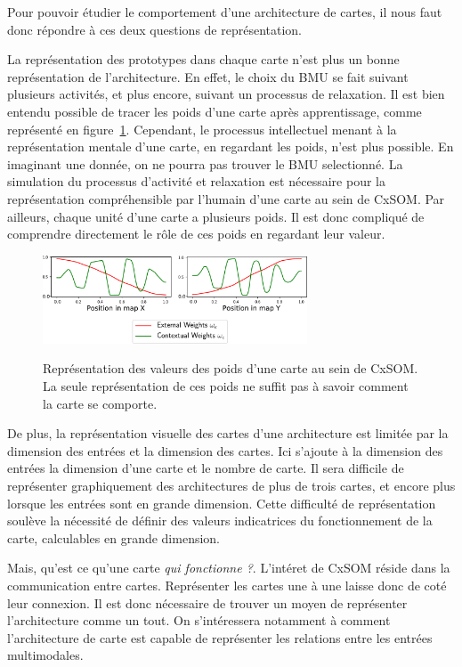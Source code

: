 Pour pouvoir étudier le comportement d'une architecture de cartes, il nous faut donc répondre à ces deux questions de représentation. 

La représentation des prototypes dans chaque carte n'est plus un bonne représentation de l'architecture.
En effet, le choix du BMU se fait suivant plusieurs activités, et plus encore, suivant un processus de relaxation. Il est bien entendu possible de tracer les poids d'une carte après apprentissage, comme représenté en figure~\ref{fig:weights}. Cependant, le processus intellectuel menant à la représentation mentale d'une carte, en regardant les poids, n'est plus possible. En imaginant une donnée, on ne pourra pas trouver le BMU selectionné. La simulation du processus d'activité et relaxation est nécessaire pour la représentation compréhensible par l'humain d'une carte au sein de CxSOM. Par ailleurs, chaque unité d'une carte a plusieurs poids. Il est donc compliqué de comprendre directement le rôle de ces poids en regardant leur valeur.
\begin{figure}
\centering
\includegraphics[width=0.7\textwidth]{weights_2.pdf}
\label{fig:weights}
\caption{Représentation des valeurs des poids d'une carte au sein de CxSOM. La seule représentation de ces poids ne suffit pas à savoir comment la carte se comporte. }
\end{figure}
De plus, la représentation visuelle des cartes d'une architecture est limitée par la dimension des entrées et la dimension des cartes. Ici s'ajoute à la dimension des entrées la dimension d'une carte et le nombre de carte. Il sera difficile de représenter graphiquement des architectures de plus de trois cartes, et encore plus lorsque les entrées sont en grande dimension. Cette difficulté de représentation soulève la nécessité de définir des valeurs indicatrices du fonctionnement de la carte, calculables en grande dimension.

Mais, qu'est ce qu'une carte \emph{qui fonctionne ?}. L'intéret de CxSOM réside dans la communication entre cartes. Représenter les cartes une à une laisse donc de coté leur connexion. Il est donc nécessaire de trouver un moyen de représenter l'architecture comme un tout. On s'intéressera notamment à comment l'architecture de carte est capable de représenter les relations entre les entrées multimodales.

